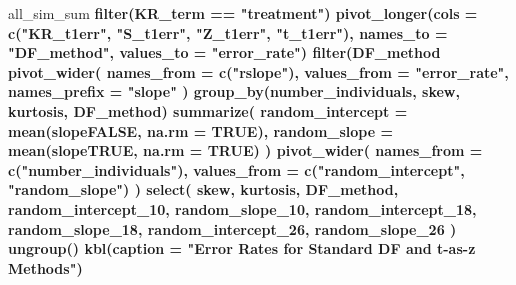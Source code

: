 \documentclass[12pt, twoside]{amherstthesis}
\newenvironment{Shaded}{\begin{snugshade}}{\end{snugshade}}
\newcommand{\DataTypeTok}[1]{\textcolor[rgb]{0.13,0.29,0.53}{#1}}
\newcommand{\DecValTok}[1]{\textcolor[rgb]{0.00,0.00,0.81}{#1}}
\newcommand{\KeywordTok}[1]{\textcolor[rgb]{0.13,0.29,0.53}{\textbf{#1}}}
\newcommand{\NormalTok}[1]{#1}
\newcommand{\OperatorTok}[1]{\textcolor[rgb]{0.81,0.36,0.00}{\textbf{#1}}}
\newcommand{\OtherTok}[1]{\textcolor[rgb]{0.56,0.35,0.01}{#1}}
\newcommand{\StringTok}[1]{\textcolor[rgb]{0.31,0.60,0.02}{#1}}
\begin{document}
\begin{Shaded}
\begin{Highlighting}[]
\NormalTok{all_sim_sum }\OperatorTok{%>%}
\StringTok{  }\KeywordTok{filter}\NormalTok{(KR_term }\OperatorTok{==}\StringTok{ "treatment"}\NormalTok{) }\OperatorTok{%>%}
\StringTok{  }\KeywordTok{pivot_longer}\NormalTok{(}\DataTypeTok{cols =} \KeywordTok{c}\NormalTok{(}\StringTok{"KR_t1err"}\NormalTok{, }\StringTok{"S_t1err"}\NormalTok{, }\StringTok{"Z_t1err"}\NormalTok{, }\StringTok{"t_t1err"}\NormalTok{), }
               \DataTypeTok{names_to =} \StringTok{"DF_method"}\NormalTok{, }\DataTypeTok{values_to =} \StringTok{"error_rate"}\NormalTok{) }\OperatorTok{%>%}
\StringTok{  }\KeywordTok{filter}\NormalTok{(DF_method }\OperatorTok{%in%}\StringTok{ }\KeywordTok{c}\NormalTok{(}\StringTok{"Z_t1err"}\NormalTok{, }\StringTok{"t_t1err"}\NormalTok{)) }\OperatorTok{%>%}
\StringTok{  }\KeywordTok{pivot_wider}\NormalTok{(}
    \DataTypeTok{names_from =} \KeywordTok{c}\NormalTok{(}\StringTok{"rslope"}\NormalTok{),}
    \DataTypeTok{values_from =} \StringTok{"error_rate"}\NormalTok{, }\DataTypeTok{names_prefix =} \StringTok{"slope"}
\NormalTok{  ) }\OperatorTok{%>%}
\StringTok{  }\KeywordTok{group_by}\NormalTok{(number_individuals, skew, kurtosis, DF_method) }\OperatorTok{%>%}
\StringTok{  }\KeywordTok{summarize}\NormalTok{(}
    \DataTypeTok{random_intercept =} \KeywordTok{mean}\NormalTok{(slopeFALSE, }\DataTypeTok{na.rm =} \OtherTok{TRUE}\NormalTok{),}
    \DataTypeTok{random_slope =} \KeywordTok{mean}\NormalTok{(slopeTRUE, }\DataTypeTok{na.rm =} \OtherTok{TRUE}\NormalTok{)}
\NormalTok{  ) }\OperatorTok{%>%}
\StringTok{  }\KeywordTok{pivot_wider}\NormalTok{(}
    \DataTypeTok{names_from =} \KeywordTok{c}\NormalTok{(}\StringTok{"number_individuals"}\NormalTok{),}
    \DataTypeTok{values_from =} \KeywordTok{c}\NormalTok{(}\StringTok{"random_intercept"}\NormalTok{, }\StringTok{"random_slope"}\NormalTok{)}
\NormalTok{  ) }\OperatorTok{%>%}
\StringTok{  }\KeywordTok{select}\NormalTok{(}
\NormalTok{    skew, kurtosis, DF_method, random_intercept_}\DecValTok{10}\NormalTok{, random_slope_}\DecValTok{10}\NormalTok{, }
\NormalTok{    random_intercept_}\DecValTok{18}\NormalTok{,}
\NormalTok{    random_slope_}\DecValTok{18}\NormalTok{, random_intercept_}\DecValTok{26}\NormalTok{, random_slope_}\DecValTok{26}
\NormalTok{  ) }\OperatorTok{%>%}
\StringTok{  }\KeywordTok{ungroup}\NormalTok{() }\OperatorTok{%>%}
\StringTok{  }\KeywordTok{kbl}\NormalTok{(}\DataTypeTok{caption =} \StringTok{"Error Rates for Standard DF and t-as-z Methods"}\NormalTok{) }\OperatorTok{%>%}
}}}}}}}}}}}
\end{Highlighting}
\end{Shaded}
\end{document}
